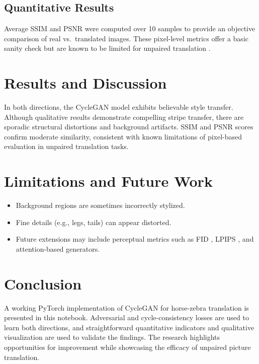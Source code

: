 \documentclass[11pt,a4paper]{article}
\begin{document}
\FloatBarrier

\subsection{Quantitative Results}
Average SSIM and PSNR were computed over 10 samples to provide an objective comparison of real vs.\ translated images. These pixel-level metrics offer a basic sanity check but are known to be limited for unpaired translation \cite{Wang2004SSIM}.

\section{Results and Discussion}
In both directions, the CycleGAN model exhibits believable style transfer. Although qualitative results demonstrate compelling stripe transfer, there are sporadic structural distortions and background artifacts. SSIM and PSNR scores confirm moderate similarity, consistent with known limitations of pixel-based evaluation in unpaired translation tasks.

\section{Limitations and Future Work}
\begin{itemize}[leftmargin=1.25em]
    \item Background regions are sometimes incorrectly stylized.
    \item Fine details (e.g., legs, tails) can appear distorted.
    \item Future extensions may include perceptual metrics such as FID \cite{Heusel2017FID}, LPIPS \cite{Zhang2018LPIPS}, and attention-based generators.
\end{itemize}

\section{Conclusion}
A working PyTorch implementation of CycleGAN for horse-zebra translation is presented in this notebook. Adversarial and cycle-consistency losses are used to learn both directions, and straightforward quantitative indicators and qualitative visualization are used to validate the findings. The research highlights opportunities for improvement while showcasing the efficacy of unpaired picture translation.



\end{document}
